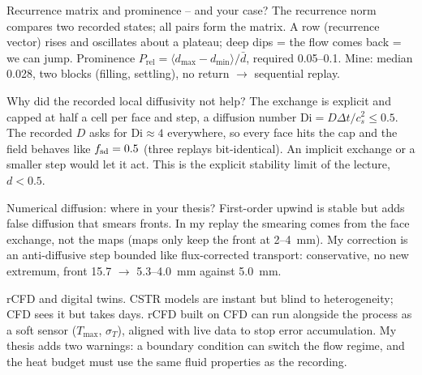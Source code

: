 \begin{qabox}[Pirker]{\pred Recurrence matrix and prominence -- and your case?}
\ans The recurrence norm compares two recorded states; all pairs form the matrix. A row (recurrence
vector) rises and oscillates about a plateau; deep dips = the flow comes back = we can jump.
Prominence $P_{\mathrm{rel}}=\langle d_{\max}-d_{\min}\rangle/\bar d$, required 0.05--0.1. Mine: median
0.028, two blocks (filling, settling), no return $\to$ sequential replay.
\end{qabox}

\begin{qabox}[Pirker]{\pred Why did the recorded local diffusivity not help?}
\ans The exchange is explicit and capped at half a cell per face and step, a diffusion number
$\mathrm{Di}=D\Delta t/c_s^2\le0.5$. The recorded $D$ asks for $\mathrm{Di}\approx4$ everywhere, so
every face hits the cap and the field behaves like $f_{\mathrm{sd}}=0.5$ (three replays bit-identical).
An implicit exchange or a smaller step would let it act. This is the explicit stability limit of
the lecture, $d<0.5$.
\end{qabox}

\begin{qabox}[Pirker]{\pred Numerical diffusion: where in your thesis?}
\ans First-order upwind is stable but adds false diffusion that smears fronts. In my replay the
smearing comes from the face exchange, not the maps (maps only keep the front at 2--4~mm). My
correction is an anti-diffusive step bounded like flux-corrected transport: conservative, no new
extremum, front 15.7 $\to$ 5.3--4.0~mm against 5.0~mm.
\end{qabox}

\begin{qabox}[Pirker]{\pred rCFD and digital twins.}
\ans CSTR models are instant but blind to heterogeneity; CFD sees it but takes days. rCFD built on
CFD can run alongside the process as a soft sensor ($T_{\max}$, $\sigma_T$), aligned with live data
to stop error accumulation. My thesis adds two warnings: a boundary condition can switch the flow
regime, and the heat budget must use the same fluid properties as the recording.
\end{qabox}

